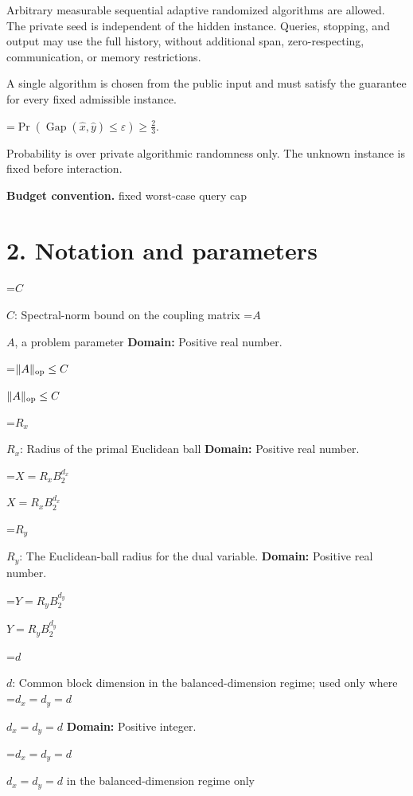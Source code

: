 \documentclass[10pt,a4paper]{article}
\newcommand{\AtlasMath}[1]{\par\begingroup\centering\setbox0=\hbox{$\displaystyle #1$}\ifdim\wd0>1.4\linewidth\typeout{ATLAS WIDE FORMULA: \the\wd0}\fi\ifdim\wd0>\linewidth\resizebox{\linewidth}{!}{\box0}\else\box0\fi\par\endgroup}
\newcommand{\AtlasInlineMath}[1]{\begingroup\setbox0=\hbox{$#1$}\ifdim\wd0>.4\linewidth\endgroup\AtlasMath{#1}\else\endgroup$#1$\fi}
\begin{document}
Arbitrary measurable sequential adaptive randomized algorithms are allowed. The private seed is independent of the hidden instance. Queries, stopping, and output may use the full history, without additional span, zero-respecting, communication, or memory restrictions.



A single algorithm is chosen from the public input and must satisfy the guarantee for every fixed admissible instance.




\AtlasMath{\Pr\!\left(\operatorname{Gap}(\widehat{x},\widehat{y})\le\varepsilon\right)\ge\frac23.}




Probability is over private algorithmic randomness only. The unknown instance is fixed before interaction.



\textbf{Budget convention.} fixed worst-case query cap



\section{2. Notation and parameters}


\AtlasInlineMath{C}: Spectral-norm bound on the coupling matrix \AtlasInlineMath{A}, a problem parameter \textbf{Domain:} Positive real number.



\AtlasInlineMath{\|A\|_{\rm op}\le C}



\AtlasInlineMath{R_x}: Radius of the primal Euclidean ball \textbf{Domain:} Positive real number.



\AtlasInlineMath{X=R_xB_2^{d_x}}



\AtlasInlineMath{R_y}: The Euclidean-ball radius for the dual variable. \textbf{Domain:} Positive real number.



\AtlasInlineMath{Y=R_yB_2^{d_y}}



\AtlasInlineMath{d}: Common block dimension in the balanced-dimension regime; used only where \AtlasInlineMath{d_x=d_y=d} \textbf{Domain:} Positive integer.



\AtlasInlineMath{d_x=d_y=d} in the balanced-dimension regime only
\end{document}
